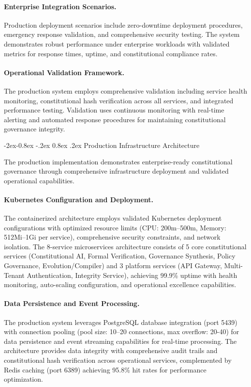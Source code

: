 \documentclass[manuscript,screen,9pt]{acmart}
\makeatletter
\renewcommand\subsubsection{\@startsection{subsubsection}{3}{\z@}%
  {-2ex\@plus -0.8ex \@minus -.2ex}%
  {0.8ex \@plus .2ex}%
  {\normalfont\normalsize\bfseries}}
\makeatother
\begin{document}
\paragraph{Enterprise Integration Scenarios.} Production deployment scenarios include zero-downtime deployment procedures, emergency response validation, and comprehensive security testing. The system demonstrates robust performance under enterprise workloads with validated metrics for response times, uptime, and constitutional compliance rates.

\paragraph{Operational Validation Framework.} The production system employs comprehensive validation including service health monitoring, constitutional hash verification across all services, and integrated performance testing. Validation uses continuous monitoring with real-time alerting and automated response procedures for maintaining constitutional governance integrity.

\subsubsection{Production Infrastructure Architecture}
\label{subsubsec:production_infrastructure}

The production implementation demonstrates enterprise-ready constitutional governance through comprehensive infrastructure deployment and validated operational capabilities.

\paragraph{Kubernetes Configuration and Deployment.} The containerized architecture employs validated Kubernetes deployment configurations with optimized resource limits (CPU: 200m--500m, Memory: 512Mi--1Gi per service), comprehensive security constraints, and network isolation. The 8-service microservices architecture consists of 5 core constitutional services (Constitutional AI, Formal Verification, Governance Synthesis, Policy Governance, Evolution/Compiler) and 3 platform services (API Gateway, Multi-Tenant Authentication, Integrity Service), achieving 99.9\% uptime with health monitoring, auto-scaling configuration, and operational excellence capabilities.

\paragraph{Data Persistence and Event Processing.} The production system leverages PostgreSQL database integration (port 5439) with connection pooling (pool size: 10--20 connections, max overflow: 20-40) for data persistence and event streaming capabilities for real-time processing.
The architecture provides data integrity with comprehensive audit trails and constitutional hash verification across operational services, complemented by Redis caching (port 6389) achieving 95.8\% hit rates for performance optimization.
\end{document}
